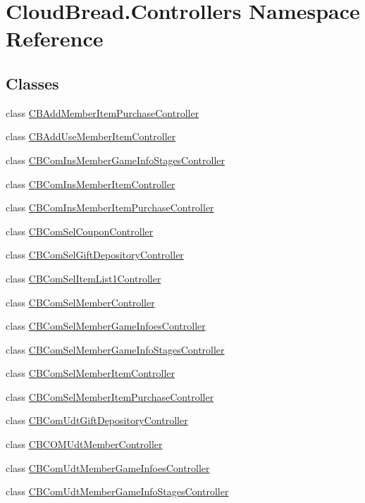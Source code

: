 \hypertarget{a00218}{}\section{Cloud\+Bread.\+Controllers Namespace Reference}
\label{a00218}
\subsection*{Classes}
\begin{DoxyCompactItemize}
\item 
class \hyperlink{a00006}{C\+B\+Add\+Member\+Item\+Purchase\+Controller}
\item 
class \hyperlink{a00007}{C\+B\+Add\+Use\+Member\+Item\+Controller}
\item 
class \hyperlink{a00010}{C\+B\+Com\+Ins\+Member\+Game\+Info\+Stages\+Controller}
\item 
class \hyperlink{a00011}{C\+B\+Com\+Ins\+Member\+Item\+Controller}
\item 
class \hyperlink{a00012}{C\+B\+Com\+Ins\+Member\+Item\+Purchase\+Controller}
\item 
class \hyperlink{a00013}{C\+B\+Com\+Sel\+Coupon\+Controller}
\item 
class \hyperlink{a00014}{C\+B\+Com\+Sel\+Gift\+Depository\+Controller}
\item 
class \hyperlink{a00015}{C\+B\+Com\+Sel\+Item\+List1\+Controller}
\item 
class \hyperlink{a00016}{C\+B\+Com\+Sel\+Member\+Controller}
\item 
class \hyperlink{a00017}{C\+B\+Com\+Sel\+Member\+Game\+Infoes\+Controller}
\item 
class \hyperlink{a00018}{C\+B\+Com\+Sel\+Member\+Game\+Info\+Stages\+Controller}
\item 
class \hyperlink{a00019}{C\+B\+Com\+Sel\+Member\+Item\+Controller}
\item 
class \hyperlink{a00020}{C\+B\+Com\+Sel\+Member\+Item\+Purchase\+Controller}
\item 
class \hyperlink{a00021}{C\+B\+Com\+Udt\+Gift\+Depository\+Controller}
\item 
class \hyperlink{a00022}{C\+B\+C\+O\+M\+Udt\+Member\+Controller}
\item 
class \hyperlink{a00023}{C\+B\+Com\+Udt\+Member\+Game\+Infoes\+Controller}
\item 
class \hyperlink{a00024}{C\+B\+Com\+Udt\+Member\+Game\+Info\+Stages\+Controller}
\item 

\end{DoxyCompactItemize}

